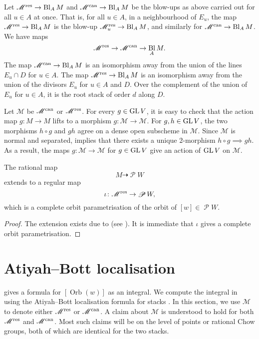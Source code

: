 \documentclass{amsart}
\DeclareMathOperator{\Orb}{Orb}
\DeclareMathOperator{\sP}{\mathscr P}
\DeclareMathOperator{\Bl}{Bl}
\begin{document}
Let \(\mathscr M^{\rm res} \to \Bl_AM\) and \(\mathscr M^{\rm can} \to \Bl_AM\) be the blow-ups as above carried out for all \(u \in A\) at once.
That is, for all \(u \in A\), in a neighbourhood of \(E_u\), the map \(\mathscr M^{\rm res} \to \Bl_AM\) is the blow-up \(\mathscr M^{\rm res}_u \to \Bl_AM \), and similarly for \(\mathscr M^{\rm can} \to \Bl_AM\).
We have maps
\[ \mathscr M^{\rm res} \to \mathscr M^{\rm can} \to \Bl_AM.\]
The map \(\mathscr M^{\rm can} \to \Bl_A M\) is an isomorphism away from the union of the lines \(E_u \cap D\) for \(u \in A\).
The map \(\mathscr M^{\rm res} \to \Bl_A M\) is an isomorphism away from the union of the divisors \(E_u\) for \(u \in A\) and \(D\).
Over the complement of the union of \(E_u\) for \(u \in A\), it is the root stack of order \(d\) along \(D\).

Let \(\mathscr M\) be \(\mathscr M^{\rm can}\) or \(\mathscr M^{\rm res}\).
For every \(g \in \operatorname{GL} V\), it is easy to check that the action map \(g \colon M \to M\) lifts to a morphism \(g \colon \mathscr M \to \mathscr M\).
For \(g,h \in \operatorname{GL} V\), the two morphisms \(h \circ g\) and \(gh\) agree on a dense open subscheme in \(\mathscr M\).
Since \(\mathscr M\) is normal and separated, \cite[Appendix~A]{fan.man.nir:10} implies that there exists a unique \(2\)-morphism \(h \circ g \implies gh\).
As a result, the maps \(g \colon \mathscr M \to \mathscr M\) for \(g \in \operatorname{GL} V\) give an action of \(\operatorname{GL} V\) on \(\mathscr M\).

\begin{proposition}\label{prop:Mresolution}
  The rational map
  \[ M \dashrightarrow \sP W\]
  extends to a regular map
  \[ \iota \colon \mathscr M^{\rm res} \to \sP W,\]
  which is a complete orbit parametrisation of the orbit of \([w] \in \sP W\).
\end{proposition}
\begin{proof}
  The extension exists due to  (see ).
  It is immediate that \(\iota\) gives a complete orbit parametrisation.
\end{proof}

\section{Atiyah--Bott localisation}\label{sec:localisation}
 gives a formula for \([\Orb(w)]\) as an integral.
We compute the integral in  using the Atiyah--Bott localisation formula for stacks \cite[\S~5.3]{kre:99}.
In this section, we use \(\mathscr M\) to denote either \(\mathscr M^{\rm res}\) or \(\mathscr M^{\rm can}\).
A claim about \(\mathscr M\) is understood to hold for both \(\mathscr M^{\rm res}\) and \(\mathscr M^{\rm can}\).
Most such claims will be on the level of points or rational Chow groups, both of which are identical for the two stacks.
\end{document}
